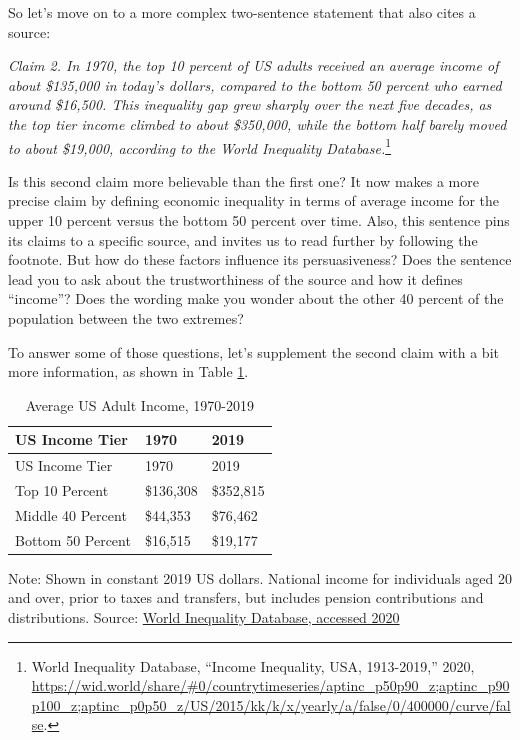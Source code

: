 \documentclass[
  english,
]{book}
\begin{document}
So let's move on to a more complex two-sentence statement that also cites a source:

\emph{Claim 2. In 1970, the top 10 percent of US adults received an average income of about \$135,000 in today's dollars, compared to the bottom 50 percent who earned around \$16,500. This inequality gap grew sharply over the next five decades, as the top tier income climbed to about \$350,000, while the bottom half barely moved to about \$19,000, according to the World Inequality Database.}\footnote{World Inequality Database, {``Income {Inequality}, {USA}, 1913-2019,''} 2020, \url{https://wid.world/share/\#0/countrytimeseries/aptinc_p50p90_z;aptinc_p90p100_z;aptinc_p0p50_z/US/2015/kk/k/x/yearly/a/false/0/400000/curve/false}.}

Is this second claim more believable than the first one? It now makes a more precise claim by defining economic inequality in terms of average income for the upper 10 percent versus the bottom 50 percent over time. Also, this sentence pins its claims to a specific source, and invites us to read further by following the footnote. But how do these factors influence its persuasiveness? Does the sentence lead you to ask about the trustworthiness of the source and how it defines ``income''? Does the wording make you wonder about the other 40 percent of the population between the two extremes?

To answer some of those questions, let's supplement the second claim with a bit more information, as shown in Table \ref{tab:us-income}.

\begin{longtable}[]{@{}lll@{}}
\caption{\label{tab:us-income} Average US Adult Income, 1970-2019}\tabularnewline
\toprule
US Income Tier & 1970 & 2019 \\
\midrule
\endfirsthead
\toprule
US Income Tier & 1970 & 2019 \\
\midrule
\endhead
Top 10 Percent & \$136,308 & \$352,815 \\
Middle 40 Percent & \$44,353 & \$76,462 \\
Bottom 50 Percent & \$16,515 & \$19,177 \\
\bottomrule
\end{longtable}

Note: Shown in constant 2019 US dollars. National income for individuals aged 20 and over, prior to taxes and transfers, but includes pension contributions and distributions.
Source: \href{https://wid.world/share/\#0/countrytimeseries/aptinc_p50p90_z;aptinc_p90p100_z;aptinc_p0p50_z/US/2015/kk/k/x/yearly/a/false/0/400000/curve/false}{World Inequality Database, accessed 2020}
\end{document}
